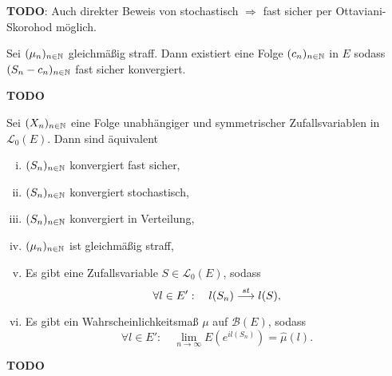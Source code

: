 \begin{remark}
    \textbf{TODO}: Auch direkter Beweis von stochastisch $\Rightarrow$ fast sicher per Ottaviani-Skorohod möglich.
\end{remark}

\begin{theorem}
    Sei $(\mu_n)_{n \in \mathbb{N}}$ gleichmäßig straff. Dann existiert eine Folge $(c_n)_{n \in \mathbb{N}}$ in $E$ sodass $(S_n - c_n)_{n \in \mathbb{N}}$ fast sicher konvergiert.
\end{theorem}

\begin{proof*}
    \textbf{TODO}
\end{proof*}

\begin{theorem}
    Sei $(X_n)_{n \in \mathbb{N}}$ eine Folge unabhängiger und symmetrischer Zufallsvariablen in $\mathcal{L}_0(E)$. Dann sind äquivalent
    \begin{enumerate}[(i)]
        \item $(S_n)_{n \in \mathbb{N}}$ konvergiert fast sicher, 
        \item $(S_n)_{n \in \mathbb{N}}$ konvergiert stochastisch, 
        \item $(S_n)_{n \in \mathbb{N}}$ konvergiert in Verteilung, 
        \item $(\mu_n)_{n \in \mathbb{N}}$ ist gleichmäßig straff, 
        \item Es gibt eine Zufallsvariable $S \in \mathcal{L}_0(E)$, sodass 
        $$
            \forall l \in E': \quad l(S_n) \overset{st}{\longrightarrow} l(S),
        $$
        \item Es gibt ein Wahrscheinlichkeitsmaß $\mu$ auf $\mathcal{B}(E)$, sodass 
        $$
            \forall l \in E': \quad \lim_{n \to \infty} E(e^{il(S_n)}) = \widehat{\mu}(l). 
        $$
    \end{enumerate}
\end{theorem}

\begin{proof*}
    \textbf{TODO}
\end{proof*}

